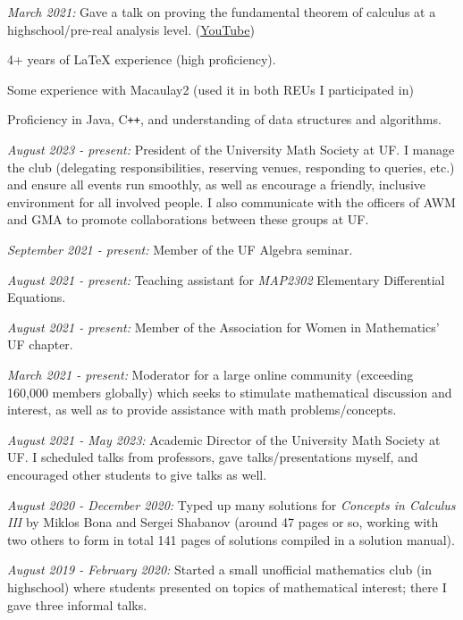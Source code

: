 \documentclass[11pt]{article}
\begin{document}
\textsl{March 2021:} Gave a talk on proving the fundamental theorem of calculus at a highschool/pre-real analysis level. ({\color{blue}\href{https://youtu.be/l4GO-n-2ETQ}{YouTube}})



4+ years of \LaTeX\hspace{1pt} experience (high proficiency).

Some experience with Macaulay2 (used it in both REUs I participated in)

Proficiency in Java, C\verb!++!, and understanding of data structures and algorithms. 


\textsl{August 2023 - present:} President of the University Math Society at UF. I manage the club (delegating responsibilities, reserving venues, responding to queries, etc.) and ensure all events run smoothly, as well as encourage a friendly, inclusive environment for all involved people. I also communicate with the officers of AWM and GMA to promote collaborations between these groups at UF.

\textsl{September 2021 - present:} Member of the UF Algebra seminar.

\textsl{August 2021 - present:} Teaching assistant for \textsl{MAP2302} Elementary Differential Equations.

\textsl{August 2021 - present:} Member of the Association for Women in Mathematics' UF chapter.

\textsl{March 2021 - present:} Moderator for a large online community (exceeding 160,000 members globally) which seeks to stimulate mathematical discussion and interest, as well as to provide assistance with math problems/concepts.

\textsl{August 2021 - May 2023:} Academic Director of the University Math Society at UF. I scheduled talks from professors, gave talks/presentations myself, and encouraged other students to give talks as well.

\textsl{August 2020 - December 2020:} Typed up many solutions for \textsl{Concepts in Calculus
III} by Miklos Bona and Sergei Shabanov (around 47 pages or so, working with two others to form in total 141 pages of solutions compiled in a solution manual).

\textsl{August 2019 - February 2020:} Started a small unofficial mathematics club (in highschool) where students presented on topics of mathematical interest; there I gave three informal talks.
\end{document}
